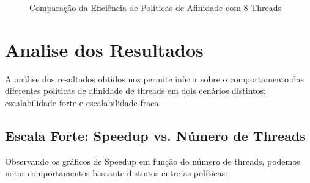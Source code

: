 \documentclass[a4paper, 12pt]{article}
\begin{document}
\begin{figure}[h!]
		\caption{Comparação da Eficiência de Políticas de Afinidade com 8 Threads}
		\label{fig:eficiencia_politicas_8_threads}
	\end{figure}
		
	\section{Analise dos Resultados}
	
	\hspace{0.62cm}A análise dos resultados obtidos nos permite inferir sobre o comportamento das diferentes políticas de afinidade de threads em dois cenários distintos: escalabilidade forte e escalabilidade fraca.
	
	\subsection{Escala Forte: Speedup vs. Número de Threads}
	\hspace{0.62cm}Observando os gráficos de Speedup em função do número de threads, podemos notar comportamentos bastante distintos entre as políticas:
	
\end{document}
